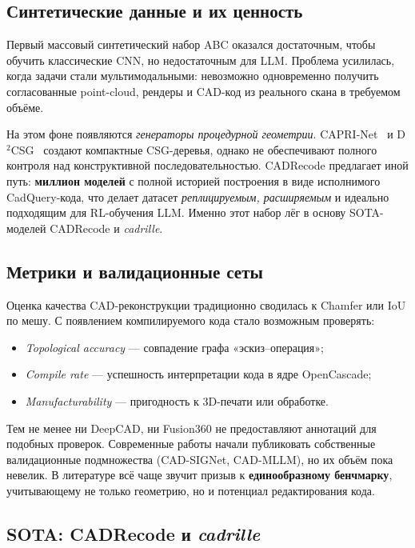 \subsection{Синтетические данные и их ценность}

Первый массовый синтетический набор ABC оказался достаточным,
чтобы обучить классические CNN, но недостаточным для LLM.
Проблема усилилась, когда задачи стали мультимодальными:
невозможно одновременно получить согласованные point-cloud,
рендеры и CAD-код из реального скана в требуемом объёме.

На этом фоне появляются \textit{генераторы процедурной геометрии}.
CAPRI-Net~\cite{yu21_caprinet} и D$^{2}$CSG~\cite{yu23_d2csg}
создают компактные CSG-деревья, однако не обеспечивают полного
контроля над конструктивной последовательностью. CADRecode
предлагает иной путь: \textbf{миллион моделей} с полной историей
построения в виде исполнимого CadQuery-кода, что делает датасет
\textit{реплицируемым, расширяемым} и идеально подходящим для
RL-обучения LLM. Именно этот набор лёг в основу SOTA-моделей
CADRecode и \textit{cadrille}.

\subsection{Метрики и валидационные сеты}

Оценка качества CAD-реконструкции традиционно сводилась к Chamfer
или IoU по мешу. С появлением компилируемого кода стало возможным
проверять:

\begin{itemize}
	\item \textit{Topological accuracy} — совпадение графа
	      «эскиз–операция»;
	\item \textit{Compile rate} — успешность интерпретации кода в
	      ядре OpenCascade;
	\item \textit{Manufacturability} — пригодность к 3D-печати или
	      обработке.
\end{itemize}

Тем не менее ни DeepCAD, ни Fusion360 не предоставляют аннотаций
для подобных проверок. Современные работы начали публиковать
собственные валидационные подмножества (CAD-SIGNet, CAD-MLLM),
но их объём пока невелик. В литературе всё чаще звучит призыв к
\textbf{единообразному бенчмарку}, учитывающему не только геометрию,
но и потенциал редактирования кода.

\subsection{SOTA: CADRecode и \textit{cadrille}}

